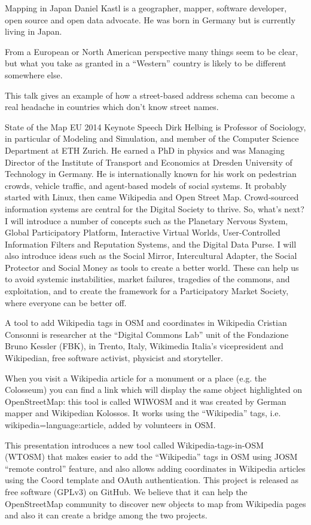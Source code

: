 %
{Mapping in Japan}%
{Daniel Kastl is a geographer, mapper, software developer, open source and open data advocate. He was born in Germany but is currently living in Japan.}%
{From a European or North American perspective many things seem to be clear, but what you take as granted in a ``Western'' country is likely to be different somewhere else.

This talk gives an example of how a street-based address schema can become a real headache in countries which don't know street names.}

%
{State of the Map EU 2014 Keynote Speech}%
{Dirk Helbing is Professor of Sociology, in particular of Modeling and 
Simulation, and member of the Computer Science Department at ETH Zurich. 
He earned a PhD in physics and was Managing Director of the Institute of 
Transport and Economics at Dresden University of Technology in Germany. 
He is internationally known for his work on pedestrian crowds, vehicle 
traffic, and agent-based models of social systems.  }%
{It probably started with Linux, then came Wikipedia and Open Street Map. 
Crowd-sourced information systems
are central for the Digital Society to thrive. So, what's next? 
I will introduce a number of concepts such as
the Planetary Nervous System, Global Participatory Platform, 
Interactive Virtual Worlds, User-Controlled
Information Filters and Reputation Systems, and the Digital Data Purse. 
I will also introduce ideas such as the Social Mirror, 
Intercultural Adapter, 
the Social Protector and Social Money as tools to create a better world. 
These can help us to avoid systemic instabilities, market failures, 
tragedies of the commons, and exploitation, and to create the framework 
for a Participatory Market Society, where everyone can be better off.}


%
{A tool to add Wikipedia tags in OSM and coordinates in Wikipedia}%
{Cristian Consonni is researcher at the ``Digital Commons Lab'' unit of the Fondazione Bruno Kessler (FBK), in Trento, Italy, Wikimedia Italia's vicepresident and Wikipedian, free software activist, physicist and storyteller.}%
{When you visit a Wikipedia article for a monument or a place (e.g. the Colosseum) you can find a link which will display the same object highlighted on OpenStreetMap: this tool is called WIWOSM and it was created by German mapper and Wikipedian Kolossos. It works using the ``Wikipedia'' tags, i.e. wikipedia=language:article, added by volunteers in OSM.

This presentation introduces a new tool called Wikipedia-tags-in-OSM (WTOSM) that makes easier to add the ``Wikipedia'' tags in OSM using JOSM ``remote control'' feature, and also allows adding coordinates in Wikipedia articles using the {{Coord}} template and OAuth authentication. This project is released as free software (GPLv3) on GitHub. We believe that it can help the OpenStreetMap community to discover new objects to map from Wikipedia pages and also it can create a bridge among the two projects.}


